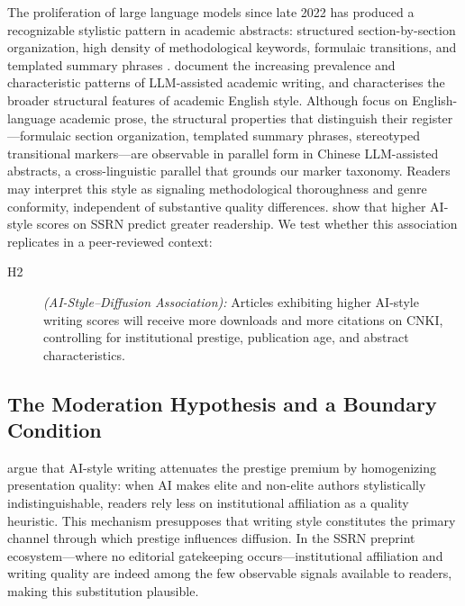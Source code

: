 \documentclass[12pt,a4paper]{article}
\begin{document}
The proliferation of large language models since late 2022 has produced
a recognizable stylistic pattern in academic abstracts: structured
section-by-section organization, high density of methodological keywords,
formulaic transitions, and templated summary phrases
\citep{Liang2024,Biber2016}.
\citet{Liang2024} document the increasing prevalence and characteristic
patterns of LLM-assisted academic writing, and \citet{Biber2016}
characterises the broader structural features of academic English style.
Although \citet{Biber2016} focus on English-language academic prose,
the structural properties that distinguish their register---formulaic
section organization, templated summary phrases, stereotyped transitional
markers---are observable in parallel form in Chinese LLM-assisted
abstracts, a cross-linguistic parallel that grounds our marker taxonomy.
Readers may interpret this style as signaling methodological
thoroughness and genre conformity, independent of substantive quality
differences.
\citet{JoLi2026} show that higher AI-style scores on SSRN predict
greater readership.
We test whether this association replicates in a peer-reviewed context:
\begin{description}
  \item[H2] \textit{(AI-Style--Diffusion Association):}
  Articles exhibiting higher AI-style writing scores will receive
  more downloads and more citations on CNKI, controlling for
  institutional prestige, publication age, and abstract
  characteristics.
\end{description}

\subsection{The Moderation Hypothesis and a Boundary Condition}

\citet{JoLi2026} argue that AI-style writing attenuates the prestige
premium by homogenizing presentation quality: when AI makes elite and
non-elite authors stylistically indistinguishable, readers rely less
on institutional affiliation as a quality heuristic.
This mechanism presupposes that writing style constitutes the primary
channel through which prestige influences diffusion.
In the SSRN preprint ecosystem---where no editorial gatekeeping
occurs---institutional affiliation and writing quality are indeed
among the few observable signals available to readers, making this
substitution plausible.
\end{document}
